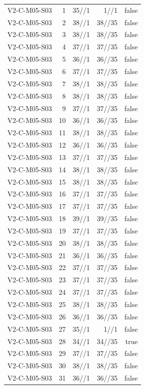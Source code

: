 {\begin{longtable}{lrrrr}
V2-C-M05-S03 & 1 & 35//1 & 1//1 & false \\
V2-C-M05-S03 & 2 & 38//1 & 38//35 & false \\
V2-C-M05-S03 & 3 & 38//1 & 38//35 & false \\
V2-C-M05-S03 & 4 & 37//1 & 37//35 & false \\
V2-C-M05-S03 & 5 & 36//1 & 36//35 & false \\
V2-C-M05-S03 & 6 & 37//1 & 37//35 & false \\
V2-C-M05-S03 & 7 & 38//1 & 38//35 & false \\
V2-C-M05-S03 & 8 & 38//1 & 38//35 & false \\
V2-C-M05-S03 & 9 & 37//1 & 37//35 & false \\
V2-C-M05-S03 & 10 & 36//1 & 36//35 & false \\
V2-C-M05-S03 & 11 & 38//1 & 38//35 & false \\
V2-C-M05-S03 & 12 & 36//1 & 36//35 & false \\
V2-C-M05-S03 & 13 & 37//1 & 37//35 & false \\
V2-C-M05-S03 & 14 & 38//1 & 38//35 & false \\
V2-C-M05-S03 & 15 & 38//1 & 38//35 & false \\
V2-C-M05-S03 & 16 & 37//1 & 37//35 & false \\
V2-C-M05-S03 & 17 & 37//1 & 37//35 & false \\
V2-C-M05-S03 & 18 & 39//1 & 39//35 & false \\
V2-C-M05-S03 & 19 & 37//1 & 37//35 & false \\
V2-C-M05-S03 & 20 & 38//1 & 38//35 & false \\
V2-C-M05-S03 & 21 & 36//1 & 36//35 & false \\
V2-C-M05-S03 & 22 & 37//1 & 37//35 & false \\
V2-C-M05-S03 & 23 & 37//1 & 37//35 & false \\
V2-C-M05-S03 & 24 & 37//1 & 37//35 & false \\
V2-C-M05-S03 & 25 & 38//1 & 38//35 & false \\
V2-C-M05-S03 & 26 & 36//1 & 36//35 & false \\
V2-C-M05-S03 & 27 & 35//1 & 1//1 & false \\
V2-C-M05-S03 & 28 & 34//1 & 34//35 & true \\
V2-C-M05-S03 & 29 & 37//1 & 37//35 & false \\
V2-C-M05-S03 & 30 & 38//1 & 38//35 & false \\
V2-C-M05-S03 & 31 & 36//1 & 36//35 & false \\

\end{longtable}}
